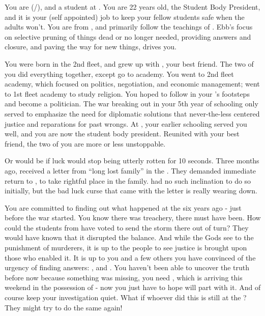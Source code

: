 \documentclass[char]{GL2020}
\begin{document}
\name{\cPresident{}}

You are \cPresident{} (\cPresident{\they}/\cPresident{\them}), and a student at \pSchool{}. You are 22 years old, the Student Body President, and it is your (self appointed) job to keep your fellow students safe when the adults won't. You are from \pShip{}, and primarily follow the teachings of \cEbb{\full}. Ebb's focus on selective pruning of things dead or no longer needed, providing answers and closure, and paving the way for new things, drives you.

You were born in the 2nd fleet, and grew up with \cInitiate{}, your best friend. The two of you did everything together, except go to academy. You went to 2nd fleet academy, which focused on politics, negotiation, and economic management; \cInitiate{\they} went to 1st fleet academy to study religion. You hoped to follow in your \cHeadDiplomat{\auncle}'s footsteps and become a politician. The war breaking out in your 5th year of schooling only served to emphasize the need for diplomatic solutions that never-the-less centered justice and reparations for past wrongs. At \pSchool{}, your earlier schooling served you well, and you are now the student body president. Reunited with your best friend, \cInitiate{} the two of you are more or less unstoppable. 

Or would be if \cInitiate{\their} luck would stop being utterly rotten for 10 seconds. Three months ago, \cInitiate{} received a letter from ``long lost family'' in the \pFarm{}. They demanded \cInitiate{\their} immediate return to \pFarm{}, to take \cInitiate{\their} rightful place in the family. \cInitiate{} had no such inclination to do so initially, but the bad luck curse that came with the letter is really wearing \cInitiate{\them} down. 

You are committed to finding out what happened at the \pSc{} six years ago - just before the war started. You know there was treachery, there must have been. How could the students from \pShip{} have voted to send the storm there out of turn? They would have known that it disrupted the balance. And while the Gods see to the punishment of murderers, it is up to the people to see justice is brought upon those who enabled it. It is up to you and a few others you have convinced of the urgency of finding answers: \cLibAssist{}, and \cHeir{}. You haven't been able to uncover the truth before now because something was missing, you need \iMirror{}, which is arriving this weekend in the possession of \cDiplomat{} - now you just have to hope \cDiplomat{\they} will part with it. And of course keep your investigation quiet. What if whoever did this is still at the \pSc{}? They might try to do the same again!
\end{document}
